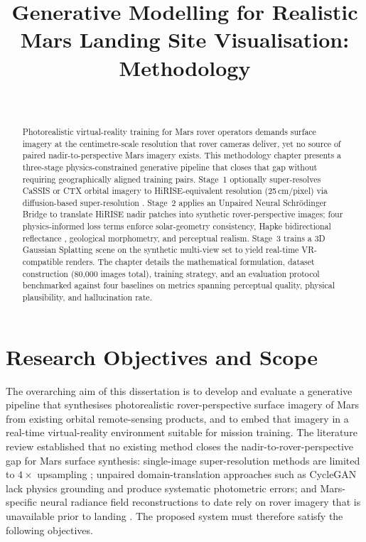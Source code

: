 \documentclass[10pt,journal]{IEEEtran}
\title{Generative Modelling for Realistic Mars Landing Site Visualisation:\\
       Methodology}
\author{%
  \IEEEauthorblockN{Deepakraj Rajmohan}\\
  \IEEEauthorblockA{\textit{MSc in Artificial Intelligence}\\
  University of Surrey\\
  deepak.dr036@gmail.com}
}
\begin{document}
\maketitle

\begin{abstract}
Photorealistic virtual-reality training for Mars rover operators demands
surface imagery at the centimetre-scale resolution that rover cameras deliver,
yet no source of paired nadir-to-perspective Mars imagery exists. This
methodology chapter presents a three-stage physics-constrained generative
pipeline that closes that gap without requiring geographically aligned training
pairs. Stage~1 optionally super-resolves CaSSIS or CTX orbital imagery to
HiRISE-equivalent resolution (25\,cm/pixel) via diffusion-based super-resolution
\cite{khanna2024diffusionsat,zhu2025taming}. Stage~2 applies an Unpaired Neural
Schr\"{o}dinger Bridge \cite{kim2024unsb} to translate HiRISE nadir patches into
synthetic rover-perspective images; four physics-informed loss terms enforce
solar-geometry consistency, Hapke bidirectional reflectance \cite{hapke2012theory},
geological morphometry, and perceptual realism. Stage~3 trains a 3D Gaussian
Splatting scene \cite{kerbl2023gaussian} on the synthetic multi-view set to
yield real-time VR-compatible renders. The chapter details the mathematical
formulation, dataset construction (80,000 images total), training strategy, and
an evaluation protocol benchmarked against four baselines on metrics spanning
perceptual quality, physical plausibility, and hallucination rate.
\end{abstract}

\section{Research Objectives and Scope}
\label{sec:objectives}

The overarching aim of this dissertation is to develop and evaluate a generative
pipeline that synthesises photorealistic rover-perspective surface imagery of
Mars from existing orbital remote-sensing products, and to embed that imagery
in a real-time virtual-reality environment suitable for mission training. The
literature review established that no existing method closes the
nadir-to-rover-perspective gap for Mars surface synthesis: single-image
super-resolution methods are limited to $4\times$ upsampling
\cite{wu2024rstsrn,tao2021cassis}; unpaired domain-translation approaches
such as CycleGAN lack physics grounding and produce systematic photometric
errors; and Mars-specific neural radiance field reconstructions to date rely
on rover imagery that is unavailable prior to landing \cite{giusti2022marf}.
The proposed system must therefore satisfy the following objectives.
\end{document}
